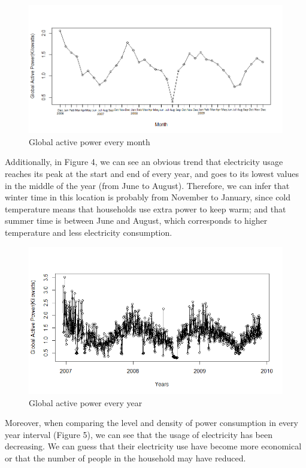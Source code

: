 \documentclass[letterpaper, 11pt]{article}%
\begin{document}
\begin{figure}[H]
  \centering
  \includegraphics[scale=0.4]{fig3}
  \caption{Global active power every month}
\end{figure}
Additionally, in Figure 4, we can see an obvious trend that electricity usage reaches its peak at the start and end of every year, and goes to its lowest values in the middle of the year (from June to August). Therefore, we can infer that winter time in this location is probably from November to January, since cold temperature means that households use extra power to keep warm; and that summer time is between June and August, which corresponds to higher temperature and less electricity consumption.
\begin{figure}[H]
  \centering
  \includegraphics[scale=0.4]{fig4}
  \caption{Global active power every year}
\end{figure}
Moreover, when comparing the level and density of power consumption in every year interval (Figure 5), we can see that the usage of electricity has been decreasing. We can guess that their electricity use have become more economical or that the number of people in the household may have reduced.
\end{document}
